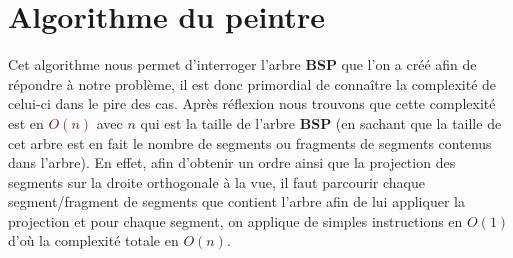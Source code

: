 \documentclass{article}
\newcommand{\red}[1]{\textcolor{darkred}{#1}}
\begin{document}
\section{Algorithme du peintre}

Cet algorithme nous permet d'interroger l'arbre \textbf{BSP} que l'on a créé afin de répondre à notre problème, il est donc primordial de connaître la complexité de celui-ci dans 
le pire des cas. Après réflexion nous trouvons que cette complexité est en \red{$O(n)$} avec $n$ qui est la taille de l'arbre \textbf{BSP} (en sachant que la taille de cet arbre est 
en fait le nombre de segments ou fragments de segments contenus dans l'arbre). En effet, afin d'obtenir un ordre ainsi que la projection des segments sur la droite orthogonale à
la vue, il faut parcourir chaque segment/fragment de segments que contient l'arbre afin de lui appliquer la projection et pour chaque segment, on applique de simples instructions 
en $O(1)$ d'où la complexité totale en $O(n)$.  \\
\end{document}
